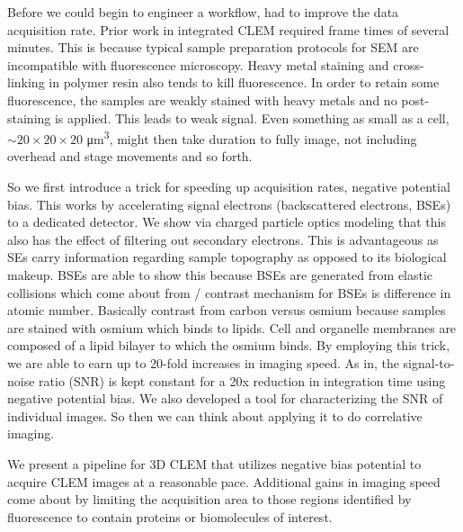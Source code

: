 


Before we could begin to engineer a workflow, had to improve the data acquisition rate. Prior work in integrated CLEM required frame times of several minutes. This is because typical sample preparation protocols for SEM are incompatible with fluorescence microscopy. Heavy metal staining and cross-linking in polymer resin also tends to kill fluorescence. In order to retain some fluorescence, the samples are weakly stained with heavy metals and no post-staining is applied. This leads to weak signal. Even something as small as a cell,
${\sim}\text{20} \times \text{20} \times \text{20}$ \si{\micro\meter^3},
might then take duration to fully image, not including overhead and stage movements and so forth.

So we first introduce a trick for speeding up acquisition rates, negative potential bias. This works by accelerating signal electrons (backscattered electrons, BSEs) to a dedicated detector. We show via charged particle optics modeling that this also has the effect of filtering out secondary electrons. This is advantageous as SEs carry information regarding sample topography as opposed to its biological makeup. BSEs are able to show this because BSEs are generated from elastic collisions which come about from / contrast mechanism for BSEs is difference in atomic number. Basically contrast from carbon versus osmium because samples are stained with osmium which binds to lipids. Cell and organelle membranes are composed of a lipid bilayer to which the osmium binds. By employing this trick, we are able to earn up to 20-fold increases in imaging speed. As in, the signal-to-noise ratio (SNR) is kept constant for a 20x reduction in integration time using negative potential bias. We also developed a tool for characterizing the SNR of individual images. So then we can think about applying it to do correlative imaging.



We present a pipeline for 3D CLEM that utilizes negative bias potential to acquire CLEM images at a reasonable pace. Additional gains in imaging speed come about by limiting the acquisition area to those regions identified by fluorescence to contain proteins or biomolecules of interest.






